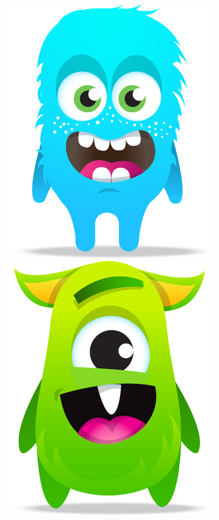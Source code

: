 \documentclass[twoside]{ctuthesis}
\theoremstyle{plain}
\theoremstyle{definition}
\theoremstyle{note}
\begin{document}
\begin{figure}[]
    \includegraphics[width=(0.25\textwidth)]{images/avatars/avatar-blue.png}
    \hspace{0.1\textwidth}
    \includegraphics[width=(0.25\textwidth)]{images/avatars/avatar-green.png}
    

\end{figure}
\end{document}
